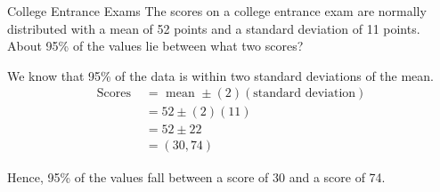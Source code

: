 \begin{example}[https://www.youtube.com/watch?v=XcZCDQln9L0]{College Entrance Exams}
The scores on a college entrance exam are normally distributed with a mean of 52 points and a standard deviation of 11 points. About 95\% of the values lie between what two scores?

\sol
We know that 95\% of the data is within two standard deviations of the mean.\\
\begin{align*}
\textrm{Scores } &= \textrm{ mean } \pm (2)(\textrm{standard deviation})\\
&= 52 \pm (2)(11)\\
&= 52 \pm 22\\
&= \boxed{(30, 74)}
\end{align*}

Hence, 95\% of the values fall between a score of 30 and a score of 74.
\end{example}
\vfill
\text{}
\vfill
\pagebreak

